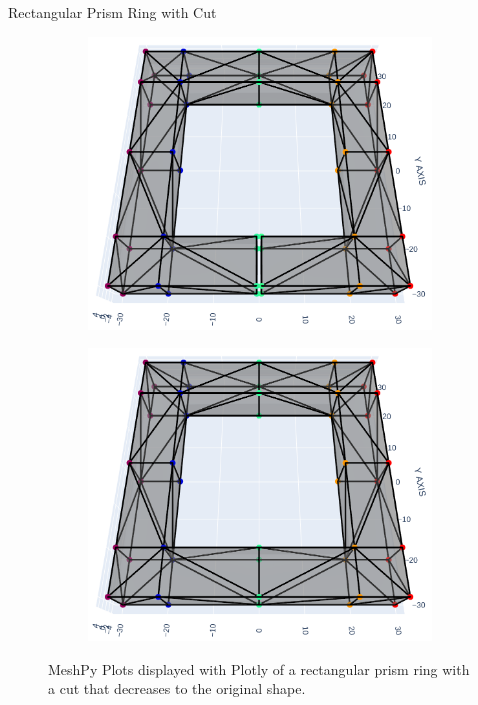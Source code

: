 \documentclass[xcolor=dvipsnames, aspectratio=169]{beamer}
\begin{document}
\begin{frame}{Rectangular Prism Ring with Cut}
\begin{figure}
\begin{subfigure}[b]{0.15\textwidth}
\includegraphics[width=\linewidth]{Final Run, (rect prism ring 01 mm cut) meshpy plotly screenshot.png}
\end{subfigure}
\begin{subfigure}[b]{0.15\textwidth}
\includegraphics[width=\linewidth]{Final Run, (rect prism ring 00 mm cut) meshpy plotly screenshot.png}
\end{subfigure}
\caption{MeshPy Plots displayed with Plotly of a rectangular prism ring with a cut that decreases to the original shape.}
\label{fig:rect_prism_ring_meshpy plotly screenshot_table}
\end{figure}
\end{frame}
\end{document}
